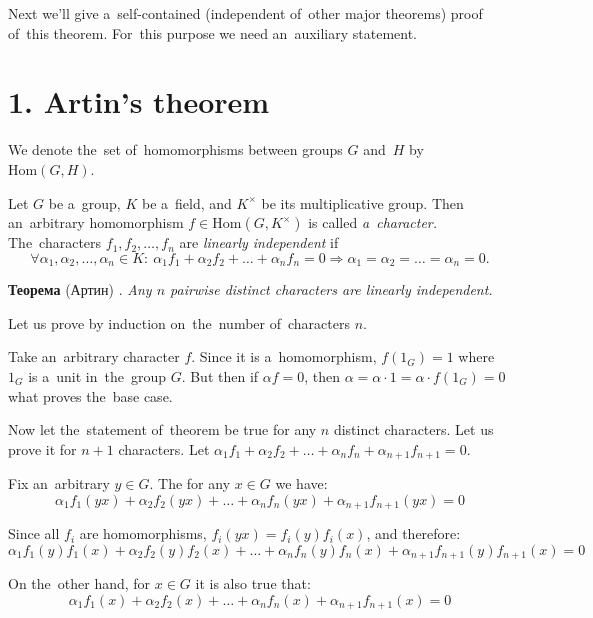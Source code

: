 \documentclass[twoside]{article}
\begin{document}
Next we'll give a~self-contained (independent of~other major theorems) proof of~this theorem.
For~this purpose we need an~auxiliary statement.

\section*{1. Artin's theorem}
We denote the~set of~homomorphisms between groups $G$ and~$H$ by~$\mathrm{Hom}(G, H)$.

Let $G$ be a~group, $K$ be a~field, and $K^{\times}$ be its multiplicative group. Then an~arbitrary
homomorphism $f \in \mathrm{Hom}(G, K^{\times})$ is called \textit{a~character.} The~characters $f_1, f_2, \ldots, f_n$
are \textit{linearly independent} if
$$
    \forall \alpha_1, \alpha_2, \ldots, \alpha_n \in K{:}\ \alpha_1 f_1 + \alpha_2 f_2 + \ldots + \alpha_n f_n = 0 \Rightarrow \alpha_1 = \alpha_2 = \ldots = \alpha_n = 0.
$$

\noindent\textbf{Теорема} (Артин) \cite{Art48}.\emph{
    Any $n$ pairwise distinct characters are linearly independent.
}\medskip

    Let us prove by induction on~the~number of~characters $n$.

    Take an~arbitrary character $f$. Since it is a~homomorphism, $f(1_G) = 1$
    where $1_G$ is a~unit in~the~group $G$. But then if $\alpha f = 0$, then
    $\alpha = \alpha \cdot 1 = \alpha \cdot f(1_G) = 0$ what proves the~base case.

    Now let the~statement of~theorem be true for any $n$ distinct characters. Let us prove
    it for $n + 1$ characters. Let $\alpha_1 f_1 + \alpha_2 f_2 + \ldots + \alpha_n f_n + \alpha_{n + 1} f_{n + 1} = 0$.

    Fix an~arbitrary $y \in G$. The for any $x \in G$ we have:
    \begin{equation}\label{Artin:first}
        \alpha_1 f_1(yx) + \alpha_2 f_2(yx) + \ldots + \alpha_n f_n(yx) + \alpha_{n + 1} f_{n + 1}(yx) = 0
    \end{equation}

    Since all $f_i$ are homomorphisms, $f_i(yx) = f_i(y) f_i(x)$, and therefore:
    $$
        \alpha_1 f_1(y) f_1(x) + \alpha_2 f_2(y) f_2(x) + \ldots + \alpha_n f_n(y) f_n(x) + \alpha_{n + 1} f_{n + 1}(y) f_{n + 1}(x) = 0
    $$

    On the~other hand, for $x \in G$ it is also true that:
    $$
        \alpha_1 f_1(x) + \alpha_2 f_2(x) + \ldots + \alpha_n f_n(x) + \alpha_{n + 1} f_{n + 1}(x) = 0
    $$
\end{document}
